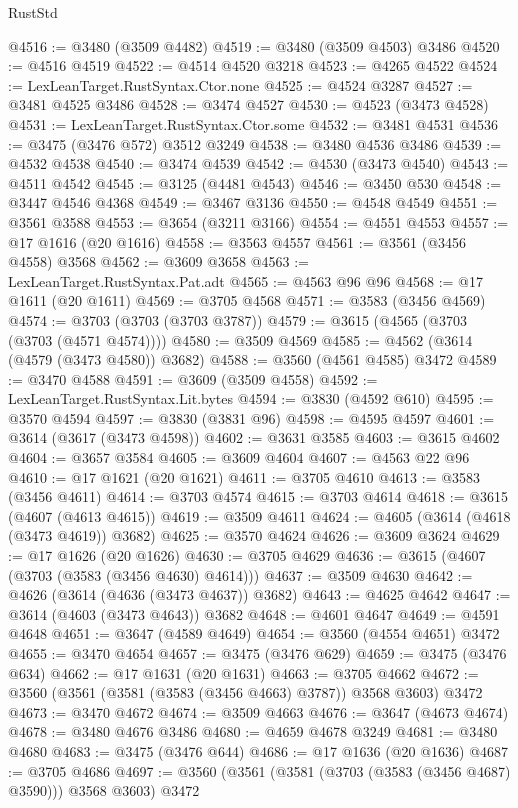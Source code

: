 \begin{lexlean}{RustStd}
\begin{coremodule}
@4516 := @3480 (@3509 @4482)
@4519 := @3480 (@3509 @4503) @3486
@4520 := @4516 @4519
@4522 := @4514 @4520 @3218
@4523 := @4265 @4522
@4524 := LexLeanTarget.RustSyntax.Ctor.none
@4525 := @4524 @3287
@4527 := @3481 @4525 @3486
@4528 := @3474 @4527
@4530 := @4523 (@3473 @4528)
@4531 := LexLeanTarget.RustSyntax.Ctor.some
@4532 := @3481 @4531
@4536 := @3475 (@3476 @572) @3512 @3249
@4538 := @3480 @4536 @3486
@4539 := @4532 @4538
@4540 := @3474 @4539
@4542 := @4530 (@3473 @4540)
@4543 := @4511 @4542
@4545 := @3125 (@4481 @4543)
@4546 := @3450 @530
@4548 := @3447 @4546 @4368
@4549 := @3467 @3136
@4550 := @4548 @4549
@4551 := @3561 @3588
@4553 := @3654 (@3211 @3166)
@4554 := @4551 @4553
@4557 := @17 @1616 (@20 @1616)
@4558 := @3563 @4557
@4561 := @3561 (@3456 @4558) @3568
@4562 := @3609 @3658
@4563 := LexLeanTarget.RustSyntax.Pat.adt
@4565 := @4563 @96 @96
@4568 := @17 @1611 (@20 @1611)
@4569 := @3705 @4568
@4571 := @3583 (@3456 @4569)
@4574 := @3703 (@3703 (@3703 @3787))
@4579 := @3615 (@4565 (@3703 (@3703 (@4571 @4574))))
@4580 := @3509 @4569
@4585 := @4562 (@3614 (@4579 (@3473 @4580)) @3682)
@4588 := @3560 (@4561 @4585) @3472
@4589 := @3470 @4588
@4591 := @3609 (@3509 @4558)
@4592 := LexLeanTarget.RustSyntax.Lit.bytes
@4594 := @3830 (@4592 @610)
@4595 := @3570 @4594
@4597 := @3830 (@3831 @96)
@4598 := @4595 @4597
@4601 := @3614 (@3617 (@3473 @4598))
@4602 := @3631 @3585
@4603 := @3615 @4602
@4604 := @3657 @3584
@4605 := @3609 @4604
@4607 := @4563 @22 @96
@4610 := @17 @1621 (@20 @1621)
@4611 := @3705 @4610
@4613 := @3583 (@3456 @4611)
@4614 := @3703 @4574
@4615 := @3703 @4614
@4618 := @3615 (@4607 (@4613 @4615))
@4619 := @3509 @4611
@4624 := @4605 (@3614 (@4618 (@3473 @4619)) @3682)
@4625 := @3570 @4624
@4626 := @3609 @3624
@4629 := @17 @1626 (@20 @1626)
@4630 := @3705 @4629
@4636 := @3615 (@4607 (@3703 (@3583 (@3456 @4630) @4614)))
@4637 := @3509 @4630
@4642 := @4626 (@3614 (@4636 (@3473 @4637)) @3682)
@4643 := @4625 @4642
@4647 := @3614 (@4603 (@3473 @4643)) @3682
@4648 := @4601 @4647
@4649 := @4591 @4648
@4651 := @3647 (@4589 @4649)
@4654 := @3560 (@4554 @4651) @3472
@4655 := @3470 @4654
@4657 := @3475 (@3476 @629)
@4659 := @3475 (@3476 @634)
@4662 := @17 @1631 (@20 @1631)
@4663 := @3705 @4662
@4672 := @3560 (@3561 (@3581 (@3583 (@3456 @4663) @3787)) @3568 @3603) @3472
@4673 := @3470 @4672
@4674 := @3509 @4663
@4676 := @3647 (@4673 @4674)
@4678 := @3480 @4676 @3486
@4680 := @4659 @4678 @3249
@4681 := @3480 @4680
@4683 := @3475 (@3476 @644)
@4686 := @17 @1636 (@20 @1636)
@4687 := @3705 @4686
@4697 := @3560 (@3561 (@3581 (@3703 (@3583 (@3456 @4687) @3590))) @3568 @3603) @3472

\end{coremodule}
\end{lexlean}
